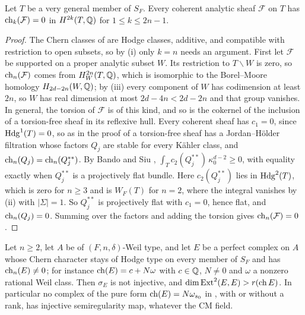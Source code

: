 \begin{proposition}
\label{prop:cmweiltorussheaves}
Let $T$ be a very general member of $S_{F}$. Every coherent analytic sheaf
$\mathcal{F}$ on $T$ has $\operatorname{ch}_{k}(\mathcal{F})=0$ in $H^{2k}(T,\mathbb{Q})$ for
$1\le k\le2n-1$.
\end{proposition}

\begin{proof}
The Chern classes of \cite{Gri10} are Hodge classes, additive, and
compatible with restriction to open subsets, so by
(i) only $k=n$ needs an argument. First let
$\mathcal{F}$ be supported on a proper analytic subset $W$. Its restriction to
$T\smallsetminus W$ is zero, so $\operatorname{ch}_{n}(\mathcal{F})$ comes from
$H^{2n}_{W}(T,\mathbb{Q})$, which is isomorphic to the Borel--Moore homology
$H_{2d-2n}(W,\mathbb{Q})$; by (iii) every component of $W$ has
codimension at least $2n$, so $W$ has real dimension at most $2d-4n<2d-2n$
and that group vanishes. In general, the torsion of $\mathcal{F}$ is of this
kind, and so is the cokernel of the inclusion of a torsion-free sheaf in its
reflexive hull. Every coherent sheaf has $c_{1}=0$, since $\mathrm{Hdg}^{1}(T)=0$, so
as in the proof of  a torsion-free sheaf has a
Jordan--H\"older filtration whose factors $Q_{j}$ are stable for every
K\"ahler class, and $\operatorname{ch}_{n}(Q_{j})=\operatorname{ch}_{n}(Q_{j}^{**})$. By Bando and Siu
\cite{BS94}, $\int_{T}c_{2}(Q_{j}^{**})\,\kappa_{0}^{d-2}\ge0$, with equality
exactly when $Q_{j}^{**}$ is a projectively flat bundle. Here
$c_{2}(Q_{j}^{**})$ lies in $\mathrm{Hdg}^{2}(T)$, which is zero for $n\ge3$ and is
$W_{F}(T)$ for $n=2$, where the integral vanishes by
(ii) with $|\Sigma|=1$. So $Q_{j}^{**}$ is projectively
flat with $c_{1}=0$, hence flat, and $\operatorname{ch}_{n}(Q_{j})=0$. Summing over the
factors and adding the torsion gives $\operatorname{ch}_{n}(\mathcal{F})=0$.
\end{proof}

\begin{theorem}
\label{thm:cmpurefalse}
Let $n\ge2$, let $A$ be of $(F,n,\delta)$-Weil type, and let $E$ be a
perfect complex on $A$ whose Chern character stays of Hodge type on every
member of $S_{F}$ and has $\operatorname{ch}_{n}(E)\ne0$; for instance
$\operatorname{ch}(E)=c+N\omega$ with $c\in\mathbb{Q}$, $N\ne0$ and $\omega$ a nonzero rational
Weil class. Then $\sigma_{E}$ is not injective, and
$\dim\operatorname{Ext}^{2}(E,E)>r(\operatorname{ch} E)$. In particular no complex of the pure form
$\operatorname{ch}(E)=N\omega_{s_{0}}$ in \cite[Theorem~17.7(v)]{paperI}, with or without a
rank, has injective semiregularity map, whatever the CM field.
\end{theorem}

